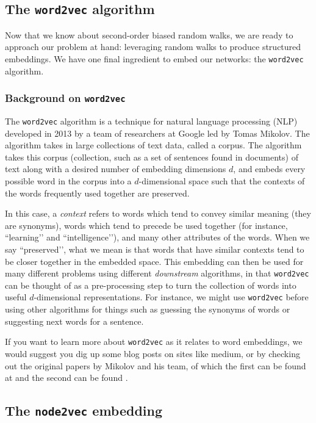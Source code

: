 \subsection{The \texttt{word2vec} algorithm}

Now that we know about second-order biased random walks, we are ready to approach our problem at hand: leveraging random walks to produce structured embeddings. We have one final ingredient to embed our networks: the \texttt{word2vec} algorithm.

\subsubsection*{Background on \texttt{word2vec}}

The \texttt{word2vec} algorithm is a technique for natural language processing (NLP) developed in 2013 by a team of researchers at Google led by Tomas Mikolov. The algorithm takes in large collections of text data, called a corpus. The algorithm takes this corpus (collection, such as a set of sentences found in documents) of text along with a desired number of embedding dimensions $d$, and embeds every possible word in the corpus into a $d$-dimensional space such that the contexts of the words frequently used together are preserved. 

In this case, a \textit{context} refers to words which tend to convey similar meaning (they are synonyms), words which tend to precede be used together (for instance, ``learning’’ and ``intelligence’’), and many other attributes of the words. When we say ``preserved’’, what we mean is that words that have similar contexts tend to be closer together in the embedded space. This embedding can then be used for many different problems using different \textit{downstream} algorithms, in that \texttt{word2vec} can be thought of as a pre-processing step to turn the collection of words into useful $d$-dimensional representations. For instance, we might use \texttt{word2vec} before using other algorithms for things such as guessing the synonyms of words or suggesting next words for a sentence.

If you want to learn more about \texttt{word2vec} as it relates to word embeddings, we would suggest you dig up some blog posts on sites like medium, or by checking out the original papers by Mikolov and his team, of which the first can be found at \cite{Mikolov2013Jan} and the second can be found \cite{Mikolov2013Oct}.

\subsection{The \texttt{node2vec} embedding}

